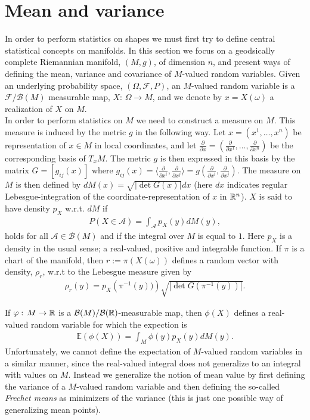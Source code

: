 \section{Mean and variance}
\label{sec:mean_and_variance}

In order to perform statistics on shapes we must first try to define central statistical concepts on manifolds. In this section we focus on a geodsically complete Riemannian manifold, $(M, g)$, of dimension $n$, and present ways of defining the mean, variance and covariance of $M$-valued random variables. Given an underlying probability space, $(\Omega, \mathcal{F}, P)$, an $M$-valued random variable is a $\mathcal{F}/\mathcal{B}(M)$ measurable map, $X: \, \Omega \rightarrow M$, and we denote by $x = X(\omega)$ a realization of $X$ on $M$.\\[0.2 cm]
In order to perform statistics on $M$ we need to construct a measure on $M$. This measure is induced by the metric $g$ in the following way. Let $x = (x^1, \ldots , x^n)$ be representation of $x \in M$ in local coordinates, and let $\frac{\partial}{\partial x} = (\frac{\partial}{\partial x^1}, \ldots , \frac{\partial}{\partial x^n})$ be the corresponding basis of $T_x M$. The metric $g$ is then expressed in this basis by the matrix $G = [g_{ij}(x)]$ where $g_{ij}(x) = \langle \frac{\partial}{\partial x^i} , \frac{\partial}{\partial x^j} \rangle = g\left(\frac{\partial}{\partial x^i}, \frac{\partial}{\partial x^j}\right)$. The measure on $M$ is then defined by $d M(x) = \sqrt{\left| \det G(x) \right|} dx$ (here $dx$ indicates regular Lebesgue-integration of the coordinate-representation of $x$ in $\mathbb{R}^n$). $X$ is said to have density $p_X$ w.r.t. $d M$ if
\begin{align*}
P(X \in \mathcal{A}) = \int_{\mathcal{A}} p_X(y) d M(y),
\end{align*}
holds for all $\mathcal{A} \in \mathcal{B}(M)$ and if the integral over $M$ is equal to $1$. Here
$p_X$ is a density in the usual sense; a real-valued, positive and integrable function. If $\pi$ is a chart of the manifold, then $r := \pi(X(\omega))$ defines a random vector with density, $\rho_r$, w.r.t to the Lebesgue measure given by
\begin{align*}
\rho_r (y) = p_X \left(\pi^{-1}(y))\right) \sqrt{\left| \det G\left(\pi^{-1}(y)\right) \right|}.
\end{align*}

If $\varphi: \, M \rightarrow \mathbb{R}$ is a $\mathcal{B}(M)/ \mathcal{B}(\mathbb{R})$-measurable map, then $\phi(X)$ defines a real-valued random variable for which the expection is
\begin{align*}
\mathbb{E} (\phi(X)) = \int_M \phi(y) p_X(y) d M(y).
\end{align*}
Unfortunately, we cannot define the expectation of $M$-valued random variables in a similar manner, since the real-valued integral does not generalize to an integral with values on $M$. Instead we generalize the notion of mean value by first defining the variance of a $M$-valued random variable and then defining the so-called \textit{Frechet means} as minimizers of the variance (this is just one possible way of generalizing mean points).


